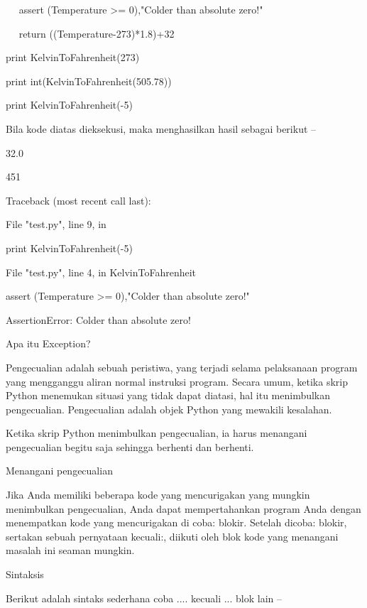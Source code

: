 ~~ assert (Temperature >= 0),"Colder than absolute zero!" \par
~~ return ((Temperature-273)*1.8)+32 \par
print KelvinToFahrenheit(273) \par
print int(KelvinToFahrenheit(505.78)) \par
print KelvinToFahrenheit(-5) \par
\vspace{12pt}
Bila kode diatas dieksekusi, maka menghasilkan hasil sebagai berikut – \par
32.0 \par
451 \par
Traceback (most recent call last): \par
File "test.py", line 9, in  \par
print KelvinToFahrenheit(-5) \par
File "test.py", line 4, in KelvinToFahrenheit \par
assert (Temperature >= 0),"Colder than absolute zero!" \par
AssertionError: Colder than absolute zero! \par
\vspace{12pt}
\vspace{12pt}
Apa itu Exception? \par
\vspace{12pt}
Pengecualian adalah sebuah peristiwa, yang terjadi selama pelaksanaan program yang mengganggu aliran normal instruksi program. Secara umum, ketika skrip Python menemukan situasi yang tidak dapat diatasi, hal itu menimbulkan pengecualian. Pengecualian adalah objek Python yang mewakili kesalahan. \par
\vspace{12pt}
Ketika skrip Python menimbulkan pengecualian, ia harus menangani pengecualian begitu saja sehingga berhenti dan berhenti. \par
Menangani pengecualian \par
\vspace{12pt}
Jika Anda memiliki beberapa kode yang mencurigakan yang mungkin menimbulkan pengecualian, Anda dapat mempertahankan program Anda dengan menempatkan kode yang mencurigakan di coba: blokir. Setelah dicoba: blokir, sertakan sebuah pernyataan kecuali:, diikuti oleh blok kode yang menangani masalah ini seaman mungkin. \par
Sintaksis \par
\vspace{12pt}
Berikut adalah sintaks sederhana coba .... kecuali ... blok lain – \par

